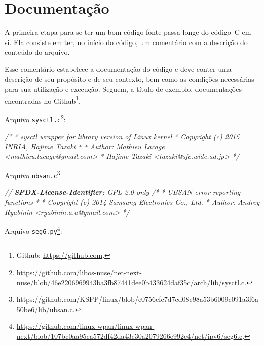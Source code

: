 \documentclass[
  11pt,
  a4paper,
]{scrbook}
\newenvironment{Shaded}{\begin{snugshade}}{\end{snugshade}}
\newcommand{\AnnotationTok}[1]{\textcolor[rgb]{0.56,0.35,0.01}{\textbf{\textit{#1}}}}
\newcommand{\CommentTok}[1]{\textcolor[rgb]{0.56,0.35,0.01}{\textit{#1}}}
\begin{document}
\section{Documentação}\label{documentauxe7uxe3o}

A primeira etapa para se ter um bom código fonte passa longe do código~C
em si. Ela consiste em ter, no início do código, um comentário com a
descrição do conteúdo do arquivo.

 Esse comentário estabelece a documentação do código
e deve conter uma descrição de seu propósito e de seu contexto, bem como
as condições necessárias para sua utilização e execução. Seguem, a
título de exemplo, documentações encontradas no Github\footnote{Github:
  \url{https://github.com}.}.

Arquivo \texttt{sysctl.c}\footnote{\url{https://github.com/libos-nuse/net-next-nuse/blob/46e2206969943ba3fb87441dee0b433624daf35c/arch/lib/sysctl.c}.}:

\begin{Shaded}
\begin{Highlighting}[]
\CommentTok{/*}
\CommentTok{ * sysctl wrapper for library version of Linux kernel}
\CommentTok{ * Copyright (c) 2015 INRIA, Hajime Tazaki}
\CommentTok{ *}
\CommentTok{ * Author: Mathieu Lacage \textless{}mathieu.lacage@gmail.com\textgreater{}}
\CommentTok{ *         Hajime Tazaki \textless{}tazaki@sfc.wide.ad.jp\textgreater{}}
\CommentTok{ */}
\end{Highlighting}
\end{Shaded}

Arquivo \texttt{ubsan.c}\footnote{\url{https://github.com/KSPP/linux/blob/e0756cfc7d7cd08c98a53b6009c091a3f6a50be6/lib/ubsan.c}.}

\begin{Shaded}
\begin{Highlighting}[]
\CommentTok{// }\AnnotationTok{SPDX{-}License{-}Identifier:}\CommentTok{ GPL{-}2.0{-}only}
\CommentTok{/*}
\CommentTok{ * UBSAN error reporting functions}
\CommentTok{ *}
\CommentTok{ * Copyright (c) 2014 Samsung Electronics Co., Ltd.}
\CommentTok{ * Author: Andrey Ryabinin \textless{}ryabinin.a.a@gmail.com\textgreater{}}
\CommentTok{ */}
\end{Highlighting}
\end{Shaded}

Arquivo \texttt{seg6.py}\footnote{\url{https://github.com/linux-wpan/linux-wpan-next/blob/107bc0aa95ca572df42da43c30a2079266e992e4/net/ipv6/seg6.c}.}:
\end{document}

